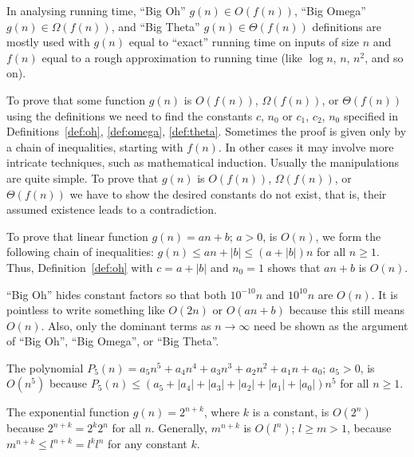 In analysing running time,
``Big Oh'' $g(n) \in O(f(n))$, ``Big Omega'' $g(n) \in \Omega(f(n))$,
and ``Big Theta'' $g(n) \in \Theta(f(n))$  
definitions are mostly used with $g(n)$ equal to 
``exact'' running time on inputs of size $n$ and 
$f(n)$ equal to a rough approximation to
running time (like \(\log n\), \(n\), \(n^2\), and so on).
 
To prove that some
function \(g(n)\) is \(O(f(n))\), \(\Omega(f(n))\), or 
\(\Theta(f(n))\) using the definitions we need to find the constants \(c\), \(n_0\) or \(c_1\), \(c_2\), \(n_0\) specified in 
Definitions~\ref{def:oh}, \ref{def:omega}, \ref{def:theta}. 
Sometimes the proof is given only by a chain of inequalities,
starting with \(f(n)\). In other cases it
may involve more intricate techniques, such as mathematical
induction. Usually the manipulations
are quite simple. To prove that \(g(n)\) is  
\(O(f(n))\), \(\Omega(f(n))\), or \(\Theta(f(n))\) we have 
to show the desired constants do not exist, that is,
their assumed existence leads to a contradiction.

\begin{Example}
To prove that 
linear function $g(n) = an + b$; $a > 0$, is $O(n)$, we
form the following chain of inequalities:  
\(g(n) \le an + |b| \le (a+|b|)n\) for all \(n \ge 1\).
Thus, Definition~\ref{def:oh}
with \(c=a+|b|\) and \(n_0 = 1\) shows 
that \(an + b\) is \(O(n)\). 
\end{Example} 
 
``Big Oh'' hides constant factors so that both $10^{-10}n$ and
$10^{10}n$ are $O(n)$. It is pointless to write something like  $O(2 
n)$ or $O(a  n + b)$ because this still means $O(n)$. Also, only 
the dominant terms as  $n \rightarrow
\infty$ need be shown as the argument of ``Big Oh'', ``Big Omega'', or
``Big Theta''.

\begin{Example} 
    The polynomial $P_{5}(n) = a_{5}n^{5} + a_{4}n^{4}+a_{3}n^{3} 
+a_{2}n^{2}+a_{1}n +a_{0}$; $a_{5}>0$, is $O(n^{5})$ 
because  
\(P_{5}(n) \leq (a_{5}+|a_{4}|+|a_{3}|+|a_{2}|+|a_{1}|+|a_{0}|)n^{5}\)
for  all \(n \ge 1\). 
\end{Example}


\begin{Example} 
\label{ex:expons}
The exponential function $g(n) = 2^{n+k}$, where $k$ is a constant,
is $O(2^{n})$ because 
\(2^{n+k} = 2^{k}  2^{n}\) for all \(n\).
Generally, $m^{n+k}$ is $O(l^{n})$; $l \ge m > 1$, because 
$m^{n+k} \le l^{n+k} = l^{k}  l^{n}$ for any constant $k$. 
\end{Example}

